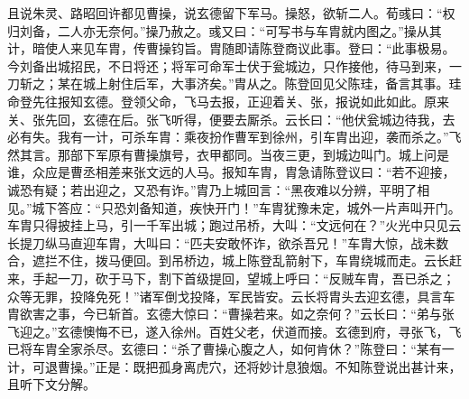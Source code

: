 且说朱灵、路昭回许都见曹操，说玄德留下军马。操怒，欲斩二人。荀彧曰：“权归刘备，二人亦无奈何。”操乃赦之。彧又曰：“可写书与车胄就内图之。”操从其计，暗使人来见车胄，传曹操钧旨。胄随即请陈登商议此事。登曰：“此事极易。今刘备出城招民，不日将还；将军可命军士伏于瓮城边，只作接他，待马到来，一刀斩之；某在城上射住后军，大事济矣。”胄从之。陈登回见父陈珪，备言其事。珪命登先往报知玄德。登领父命，飞马去报，正迎着关、张，报说如此如此。原来关、张先回，玄德在后。张飞听得，便要去厮杀。云长曰：“他伏瓮城边待我，去必有失。我有一计，可杀车胄：乘夜扮作曹军到徐州，引车胄出迎，袭而杀之。”飞然其言。那部下军原有曹操旗号，衣甲都同。当夜三更，到城边叫门。城上问是谁，众应是曹丞相差来张文远的人马。报知车胄，胄急请陈登议曰：“若不迎接，诚恐有疑；若出迎之，又恐有诈。”胄乃上城回言：“黑夜难以分辨，平明了相见。”城下答应：“只恐刘备知道，疾快开门！”车胄犹豫未定，城外一片声叫开门。车胄只得披挂上马，引一千军出城；跑过吊桥，大叫：“文远何在？”火光中只见云长提刀纵马直迎车胄，大叫曰：“匹夫安敢怀诈，欲杀吾兄！”车胄大惊，战未数合，遮拦不住，拨马便回。到吊桥边，城上陈登乱箭射下，车胄绕城而走。云长赶来，手起一刀，砍于马下，割下首级提回，望城上呼曰：“反贼车胄，吾已杀之；众等无罪，投降免死！”诸军倒戈投降，军民皆安。云长将胄头去迎玄德，具言车胄欲害之事，今已斩首。玄德大惊曰：“曹操若来。如之奈何？”云长曰：“弟与张飞迎之。”玄德懊悔不已，遂入徐州。百姓父老，伏道而接。玄德到府，寻张飞，飞已将车胄全家杀尽。玄德曰：“杀了曹操心腹之人，如何肯休？”陈登曰：“某有一计，可退曹操。”正是：既把孤身离虎穴，还将妙计息狼烟。不知陈登说出甚计来，且听下文分解。